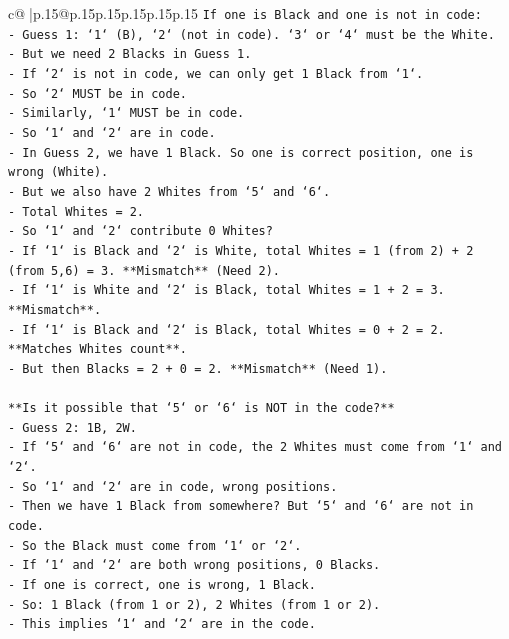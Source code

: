 \documentclass{article}
\begin{document}
{\begin{supertabular}{c@{$\;$}|p{.15\linewidth}@{}p{.15\linewidth}p{.15\linewidth}p{.15\linewidth}p{.15\linewidth}p{.15\linewidth}}
{{{\texttt{If one is Black and one is not in code:} \\
\texttt{{-} Guess 1: `1` (B), `2` (not in code). `3` or `4` must be the White.} \\
\texttt{{-} But we need 2 Blacks in Guess 1.} \\
\texttt{{-} If `2` is not in code, we can only get 1 Black from `1`.} \\
\texttt{{-} So `2` MUST be in code.} \\
\texttt{{-} Similarly, `1` MUST be in code.} \\
\texttt{{-} So `1` and `2` are in code.} \\
\texttt{{-} In Guess 2, we have 1 Black. So one is correct position, one is wrong (White).} \\
\texttt{{-} But we also have 2 Whites from `5` and `6`.} \\
\texttt{{-} Total Whites = 2.} \\
\texttt{{-} So `1` and `2` contribute 0 Whites?} \\
\texttt{{-} If `1` is Black and `2` is White, total Whites = 1 (from 2) + 2 (from 5,6) = 3. **Mismatch** (Need 2).} \\
\texttt{{-} If `1` is White and `2` is Black, total Whites = 1 + 2 = 3. **Mismatch**.} \\
\texttt{{-} If `1` is Black and `2` is Black, total Whites = 0 + 2 = 2. **Matches Whites count**.} \\
\texttt{{-} But then Blacks = 2 + 0 = 2. **Mismatch** (Need 1).} \\
\\ 
\texttt{**Is it possible that `5` or `6` is NOT in the code?**} \\
\texttt{{-} Guess 2: 1B, 2W.} \\
\texttt{{-} If `5` and `6` are not in code, the 2 Whites must come from `1` and `2`.} \\
\texttt{{-} So `1` and `2` are in code, wrong positions.} \\
\texttt{{-} Then we have 1 Black from somewhere? But `5` and `6` are not in code.} \\
\texttt{{-} So the Black must come from `1` or `2`.} \\
\texttt{{-} If `1` and `2` are both wrong positions, 0 Blacks.} \\
\texttt{{-} If one is correct, one is wrong, 1 Black.} \\
\texttt{{-} So: 1 Black (from 1 or 2), 2 Whites (from 1 or 2).} \\
\texttt{{-} This implies `1` and `2` are in the code.} \\
}}}
\end{supertabular}}
\end{document}

